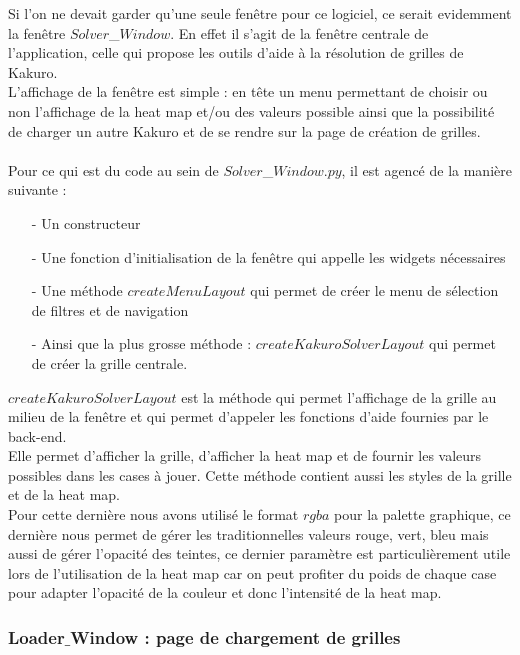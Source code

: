 \documentclass[french,12pt]{article}
\begin{document}
Si l'on ne devait garder qu'une seule fenêtre pour ce logiciel, ce serait evidemment la fenêtre $Solver$\_$Window$. En effet il s'agit de la fenêtre centrale de l'application, celle qui propose les outils d'aide à la résolution de grilles de Kakuro. \\
L'affichage de la fenêtre est simple : en tête un menu permettant de choisir ou non l'affichage de la heat map et/ou des valeurs possible ainsi que la possibilité de charger un autre Kakuro et de se rendre sur la page de création de grilles. \\ \\

Pour ce qui est du code au sein de $Solver$\_$Window.py$, il est agencé de la manière suivante : \\ 
\begin{itemize}
	\item[-] Un constructeur 
	\item[-] Une fonction d'initialisation de la fenêtre qui appelle les widgets 				nécessaires
	\item[-] Une méthode $createMenuLayout$ qui permet de créer le menu de sélection de filtres et de navigation
	\item[-] Ainsi que la plus grosse méthode : $createKakuroSolverLayout$ qui permet de créer la grille centrale. \\
\end{itemize}

$createKakuroSolverLayout$ est la méthode qui permet l'affichage de la grille au milieu de la fenêtre et qui permet d'appeler les fonctions d'aide fournies par le back-end. \\
Elle permet d'afficher la grille, d'afficher la heat map et de fournir les valeurs possibles dans les cases à jouer. Cette méthode contient aussi les styles de la grille et de la heat map. \\
Pour cette dernière nous avons utilisé le format $rgba$ pour la palette graphique, ce dernière nous permet de gérer les traditionnelles valeurs rouge, vert, bleu mais aussi de gérer l'opacité des teintes, ce dernier paramètre est particulièrement utile lors de l'utilisation de la heat map car on peut profiter du poids de chaque case pour adapter l'opacité de la couleur et donc l'intensité de la heat map. \\ 

\newpage

\subsubsection{Loader$\_$Window : page de chargement de grilles}
\end{document}
